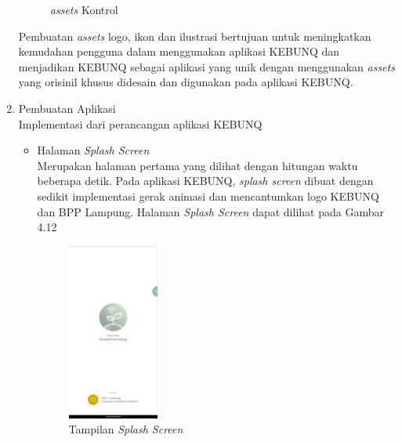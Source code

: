 \begin{flushleft}
\begin{justify}
\begin{enumerate}
\begin{figure}[ht]
                \caption{\textit{assets} Kontrol}
            \end{figure}
            \noindent Pembuatan \emph{assets} logo, ikon dan ilustrasi bertujuan untuk meningkatkan kemudahan pengguna dalam menggunakan aplikasi KEBUNQ dan menjadikan KEBUNQ sebagai aplikasi yang unik dengan menggunakan \emph{assets} yang orisinil khusus didesain dan digunakan pada aplikasi KEBUNQ. \\
            \item Pembuatan Aplikasi\\
            Implementasi dari perancangan aplikasi KEBUNQ
            \begin{itemize}
                \item Halaman \emph{Splash Screen}\\
                Merupakan halaman pertama yang dilihat dengan hitungan waktu beberapa detik. Pada aplikasi KEBUNQ, \emph{splash screen} dibuat dengan sedikit implementasi gerak animasi dan mencantumkan logo KEBUNQ dan BPP Lampung.
                Halaman \emph{Splash Screen} dapat dilihat pada Gambar 4.12
                \begin{figure}[ht]
                    \centering
                    \includegraphics[width=3cm]{images/bab 4/splash.jpeg}
                    \caption{Tampilan \emph{Splash Screen}}
                \end{figure}


\end{itemize}
\end{enumerate}
\end{justify}
\end{flushleft}
